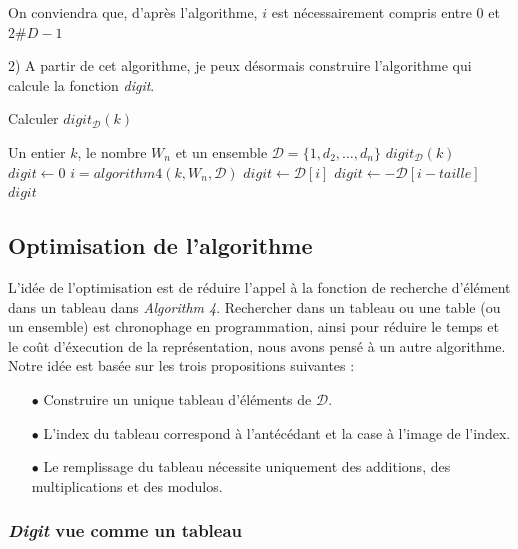 \documentclass[12pt, a4paper]{memoir}
\begin{document}
On conviendra que, d'après l'algorithme, $i$ est nécessairement compris entre $0$ et $2 \#D - 1$

2) A partir de cet algorithme, je peux désormais construire l'algorithme
qui calcule la fonction \emph{digit}.

\begin{algorithm}
 \caption{Calculer $digit_{\mathcal{D}}(k)$}
 \begin{algorithmic}
  \REQUIRE Un entier $k$, le nombre $W_n$ et un ensemble $\mathcal{D} = \{1,d_2,\ldots,d_n\}$
  \ENSURE $digit_{\mathcal{D}}(k)$
  \STATE $digit \leftarrow 0$  
  \STATE $i = algorithm4(k,W_n,\mathcal{D})$
  \STATE $digit \leftarrow \mathcal{D}[i]$
  \ELSE
  \STATE $digit \leftarrow -\mathcal{D}[i-taille]$
  \ENDIF
  \ENDIF
  \RETURN $digit$
 \end{algorithmic}
\end{algorithm}

\newpage

\subsection{Optimisation de l'algorithme}

L'idée de l'optimisation est de réduire l'appel à la fonction de recherche d'élément dans un tableau dans \emph{Algorithm 4}.
Rechercher dans un tableau ou une table (ou un ensemble) est chronophage en programmation, ainsi pour réduire
le temps et le coût d'éxecution de la représentation, nous avons pensé à un autre algorithme.
Notre idée est basée sur les trois propositions suivantes :
\begin{itemize}
 \item[$\bullet$] Construire un unique tableau d'éléments de $\mathcal{D}$.
 \item[$\bullet$] L'index du tableau correspond à l'antécédant et la case à l'image de l'index.
 \item[$\bullet$] Le remplissage du tableau nécessite uniquement des additions, des multiplications et des modulos.
\end{itemize}

\subsubsection{\emph{Digit} vue comme un tableau}
\end{document}
